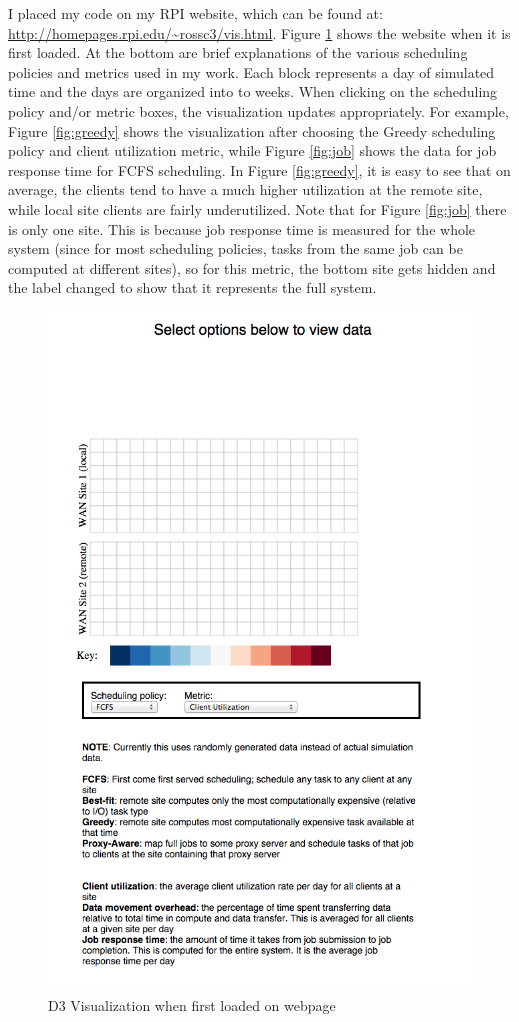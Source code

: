 \documentclass[11pt]{article}
\numberwithin{figure}{section}
\begin{document}
I placed my code on my RPI website, which can be found at: \url{http://homepages.rpi.edu/~rossc3/vis.html}. Figure \ref{fig:begin} shows the website when it is first loaded.  At the bottom are brief explanations of the various scheduling policies and metrics used in my work.  Each block represents a day of simulated time and the days are organized into to weeks.  When clicking on the scheduling policy and/or metric boxes, the visualization updates appropriately.  For example, Figure \ref{fig:greedy} shows the visualization after choosing the Greedy scheduling policy and client utilization metric, while Figure \ref{fig:job} shows the data for job response time for FCFS scheduling.  In Figure \ref{fig:greedy}, it is easy to see that on average, the clients tend to have a much higher utilization at the remote site, while local site clients are fairly underutilized.  Note that for Figure \ref{fig:job} there is only one site.  This is because job response time is measured for the whole system (since for most scheduling policies, tasks from the same job can be computed at different sites), so for this metric, the bottom site gets hidden and the label changed to show that it represents the full system.

\begin{figure}[ht]
	\centering
		\includegraphics[width=5in]{fig1.png}
	\caption{D3 Visualization when first loaded on webpage}
	\label{fig:begin}
\end{figure}
\end{document}
